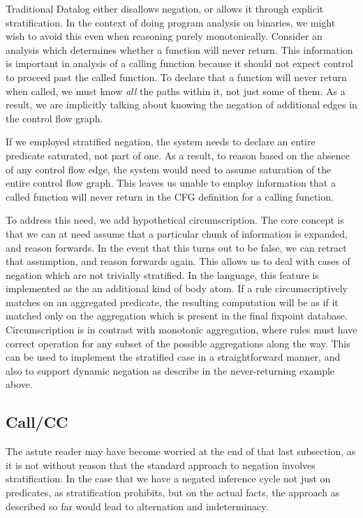 Traditional Datalog either disallows negation, or allows it through explicit stratification.
In the context of doing program analysis on binaries, we might wish to avoid this even when reasoning purely monotonically.
Consider an analysis which determines whether a function will never return.
This information is important in analysis of a calling function because it should not expect control to proceed past the called function.
To declare that a function will never return when called, we must know \emph{all} the paths within it, not just some of them.
As a result, we are implicitly talking about knowing the negation of additional edges in the control flow graph.

If we employed stratified negation, the system needs to declare an entire predicate saturated, not part of one.
As a result, to reason based on the absence of any control flow edge, the system would need to assume saturation of the entire control flow graph.
This leaves us unable to employ information that a called function will never return in the CFG definition for a calling function.

To address this need, we add hypothetical circumscription.
The core concept is that we can at need assume that a particular chunk of information is expanded, and reason forwards.
In the event that this turns out to be false, we can retract that assumption, and reason forwards again.
This allows us to deal with cases of negation which are not trivially stratified.
In the language, this feature is implemented as the an additional kind of body atom.
If a rule circumscriptively matches on an aggregated predicate, the resulting computation will be as if it matched only on the aggregation which is present in the final fixpoint database.
Circumscription is in contrast with monotonic aggregation, where rules must have correct operation for any subset of the possible aggregations along the way.
This can be used to implement the stratified case in a straightforward manner, and also to support dynamic negation as describe in the never-returning example above.

\subsection{Call/CC}
\label{sec:motive-callcc}
The astute reader may have become worried at the end of that last subsection, as it is not without reason that the standard approach to negation involves stratification.
In the case that we have a negated inference cycle not just on predicates, as stratification prohibits, but on the actual facts, the approach as described so far would lead to alternation and indeterminacy.

